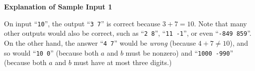 \textbf{Explanation of Sample Input 1}


On input ``\texttt{10}'', the output ``\texttt{3 7}'' is correct because $3+7=10$.
Note that many other outputs would also be correct, such as ``\texttt{2 8}'', ``\texttt{11 -1}'', or even ``\texttt{-849 859}''.
On the other hand, the answer ``\texttt{4 7}'' would be \emph{wrong} (because $4+7\neq 10$), 
and so would ``\texttt{10 0}'' (because both $a$ and $b$ must be nonzero) 
and ``\texttt{1000 -990}'' (because both $a$ and $b$ must have at most three digits.)